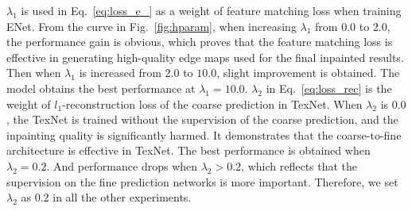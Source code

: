 $\lambda_1$ is used in Eq.~\eqref{eq:loss_e_} as a weight of feature matching loss when training ENet. %
From the curve in Fig.~\ref{fig:hparam}, when increasing $\lambda_1$ from $0.0$ to $2.0$, the performance gain is obvious, which proves that the feature matching loss is effective in
generating high-quality edge maps used for the final inpainted results. 
Then when $\lambda_1$ is increased from $2.0$ to $10.0$, slight improvement is obtained.
The model obtains the best performance at $\lambda_1=10.0$.
%
$\lambda_2$ in Eq.~\eqref{eq:loss_rec} is the weight of $l_1$-reconstruction loss of the coarse prediction in TexNet. 
When $\lambda_2$ is $0.0$, the TexNet is trained without the supervision of the coarse prediction, and the inpainting quality is significantly harmed.
It demonstrates that the coarse-to-fine architecture is effective in TexNet. The best performance is obtained when $\lambda_2=0.2$. And performance drops when $\lambda_2>0.2$, which reflects that the supervision on the fine prediction networks is more important.
Therefore, we set $\lambda_2$ as $0.2$ in all the other experiments.






 

